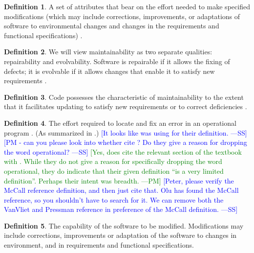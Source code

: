 \documentclass[letterpaper,cleveref]{lipics-v2019}
\newcommand{\authornote}[3]{\textcolor{#1}{[#3 ---#2]}}
\newcommand{\authornote}[3]{}
\newcommand{\wss}[1]{\authornote{blue}{SS}{#1}} %
\newcommand{\pmi}[1]{\authornote{green}{PM}{#1}} %
\theoremstyle{definition}
\newtheorem{defn}{Definition}
\begin{document}
\begin{defn}
  A set of attributes that bear on the effort needed to make specified
  modifications (which may include corrections, improvements, or adaptations of
  software to environmental changes and changes in the requirements and
  functional specifications) \citep{pfleeger2006software}.
\end{defn}

\begin{defn}
  We will view maintainability as two separate qualities: repairability and
  evolvability. Software is repairable if it allows the fixing of defects; it is
  evolvable if it allows changes that enable it to satisfy new requirements
  \citep{ghezzi1991fundamentals}.
\end{defn}

\begin{defn} \label{MaintainabilityDefnSelected2} 
  Code possesses the characteristic of maintainability to the extent that it
  facilitates updating to satisfy new requirements or to correct deficiencies
  \citep{boehm2007software}.
\end{defn}

\begin{defn}
  The effort required to locate and fix an error in an operational program
  \citep{McCallEtAl1977}. (As summarized in \citet{VanVliet2000}.) \wss{It looks
    like \citet{pressman2005software} was using \citet{McCallEtAl1977} for their
    definition.} \wss{PM - can you please look into whether
    \citet{pressman2005software} cite \citet{McCallEtAl1977}?  Do they give a
    reason for dropping the word operational?}  \pmi{Yes,
    \citet{pressman2005software} does cite the relevant section of the textbook
    with \citet{McCallEtAl1977}. While they do not give a reason for
    specifically dropping the word operational, they do indicate that their
    given definition ``is a very limited definition''. Perhaps their intent was
    breadth.} \wss{Peter, please verify the McCall reference definition, and
    then just cite that.  Olu has found the McCall reference, so you shouldn't
    have to search for it.  We can remove both the VanVliet and Pressman
    reference in  preference of the McCall definition.}
\end{defn}

\begin{defn}
  The capability of the software to be modified.  Modifications may include
  corrections, improvements or adaptation of the software to changes in
  environment, and in requirements and functional specifications. \cite{ISO9126}
\end{defn}
\end{document}
